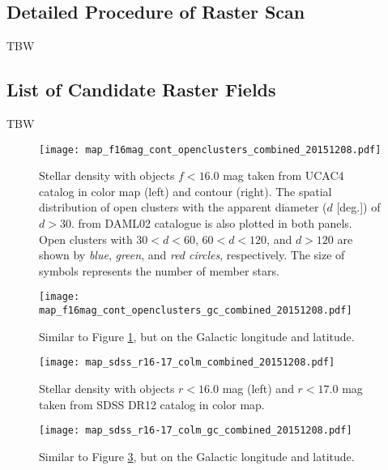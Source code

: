 \subsection{Detailed Procedure of Raster Scan}
TBW

\subsection{List of Candidate Raster Fields}
TBW

\begin{figure}[!ht]
\begin{center}
\texttt{[image: map\_f16mag\_cont\_openclusters\_combined\_20151208.pdf]}
\end{center}
\caption{Stellar density with objects $f<16.0$ mag taken from UCAC4 catalog in color map (left) and contour (right). The spatial distribution of open clusters with the apparent diameter ($d$ [deg.]) of $d>30$. from DAML02 catalogue is also plotted in both panels. Open clusters with $30<d<60$, $60<d<120$, and $d>120$ are shown by \textit{blue}, \textit{green}, and \textit{red circles}, respectively. The size of symbols represents the number of member stars.
}
\label{fig:RasterFieldMap1}
\end{figure}

\begin{figure}[!ht]
\begin{center}
\texttt{[image: map\_f16mag\_cont\_openclusters\_gc\_combined\_20151208.pdf]}
\end{center}
\caption{Similar to Figure \ref{fig:RasterFieldMap1}, but on the Galactic longitude and latitude.
}
\label{fig:RasterFieldMap2}
\end{figure}

\begin{figure}[!ht]
\begin{center}
\texttt{[image: map\_sdss\_r16-17\_colm\_combined\_20151208.pdf]}
\end{center}
\caption{Stellar density with objects $r<16.0$ mag (left) and $r<17.0$ mag taken from SDSS DR12 catalog in color map. 
}
\label{fig:RasterFieldMapSDSS1}
\end{figure}

\begin{figure}[!ht]
\begin{center}
\texttt{[image: map\_sdss\_r16-17\_colm\_gc\_combined\_20151208.pdf]}
\end{center}
\caption{Similar to Figure \ref{fig:RasterFieldMapSDSS1}, but on the Galactic longitude and latitude.
}
\label{fig:RasterFieldMapSDSS2}
\end{figure}
